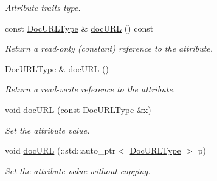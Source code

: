 \begin{DoxyCompactItemize}
\begin{DoxyCompactList}\small\item\em Attribute traits type. \item\end{DoxyCompactList}\item 
const \hyperlink{classopenstack_1_1xml_1_1Version_aed74beb6af9dc70c3ec21ba445627cec}{DocURLType} \& \hyperlink{classopenstack_1_1xml_1_1Version_a9ea46a43d798e47e3b95c15725cf467d}{docURL} () const 
\begin{DoxyCompactList}\small\item\em Return a read-\/only (constant) reference to the attribute. \item\end{DoxyCompactList}\item 
\hyperlink{classopenstack_1_1xml_1_1Version_aed74beb6af9dc70c3ec21ba445627cec}{DocURLType} \& \hyperlink{classopenstack_1_1xml_1_1Version_ab944ad6dc6751de3b1c9220aef44328c}{docURL} ()
\begin{DoxyCompactList}\small\item\em Return a read-\/write reference to the attribute. \item\end{DoxyCompactList}\item 
void \hyperlink{classopenstack_1_1xml_1_1Version_a5e5a0b3b7eb2761b2e19f8fbe9a49e18}{docURL} (const \hyperlink{classopenstack_1_1xml_1_1Version_aed74beb6af9dc70c3ec21ba445627cec}{DocURLType} \&x)
\begin{DoxyCompactList}\small\item\em Set the attribute value. \item\end{DoxyCompactList}\item 
void \hyperlink{classopenstack_1_1xml_1_1Version_aae188924ef786f1f4f33f886da3c6440}{docURL} (::std::auto\_\-ptr$<$ \hyperlink{classopenstack_1_1xml_1_1Version_aed74beb6af9dc70c3ec21ba445627cec}{DocURLType} $>$ p)
\begin{DoxyCompactList}\small\item\em Set the attribute value without copying. \item\end{DoxyCompactList}\end{DoxyCompactItemize}
